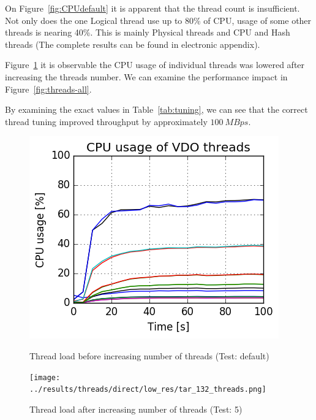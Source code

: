 \documentclass[
  color, %
  table, %
  lof,   %
  lot,   %
]{fithesis3}
\begin{document}
On Figure~\ref{fig:CPUdefault} it is apparent that the thread count is insufficient. Not only does the one Logical thread use up to 80\% of CPU, usage of some other threads is nearing 40\%. This is mainly Physical threads and CPU and Hash threads (The complete results can be found in electronic appendix).

Figure~\ref{fig:CPUtuning} it is observable the CPU usage of individual threads was lowered after increasing the threads number. We can examine the performance impact in Figure~\ref{fig:threads-all}.

By examining the exact values in Table~\ref{tab:tuning}, we can see that the correct thread tuning improved throughput by approximately $\SI{100}{MBps}$.

\begin{figure}[!htb]
\begin{minipage}{.5\textwidth}
        \includegraphics[width=\linewidth]{../results/threads/direct/low_res/tar_753_threads.png}
\caption[VDO threads load on default setting]{Thread load before increasing number of threads (Test: default)}
\label{fig:CPUdefault}
\end{minipage}
\begin{minipage}{.5\textwidth}
        \texttt{[image: ../results/threads/direct/low\_res/tar\_132\_threads.png]}
\caption[VDO threads load after tuning]{Thread load after increasing number of threads (Test: 5)}
\label{fig:CPUtuning}

\end{minipage}
\end{figure}
\end{document}
